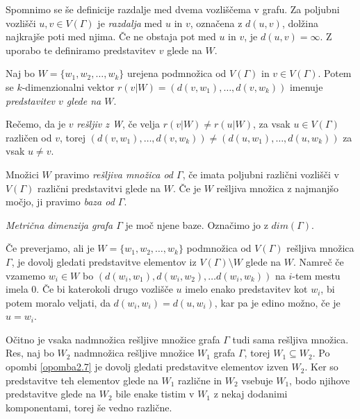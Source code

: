 \documentclass[mat1, tisk]{fmfdelo}
\begin{document}
%
Spomnimo se še definicije razdalje med dvema vozliščema v grafu. Za poljubni vozlišči 
$u,v \in V(\Gamma)$ je \emph{razdalja} med $u$ in $v$, označena z $d(u,v)$, dolžina 
najkrajše poti med njima. Če ne obstaja pot med $u$ in $v$, je $d(u,v) = \infty $.
Z uporabo te definiramo predstavitev $v$ glede na $W$.
%
\begin{definicija}
  Naj bo $W = \{ w_1,w_2, \ldots, w_k \}$ urejena podmnožica od $V(\Gamma)$ in 
  $v \in V(\Gamma)$. Potem 
  se $k$-dimenzionalni vektor $r(v|W)=( d(v,w_1), \ldots, d(v,w_k) )$ imenuje 
  \emph{predstavitev $v$ glede na $W$}. 

  Rečemo, da je $v$ \emph{rešljiv z W}, če velja $r(v|W) \neq r(u|W)$, 
  za vsak $u \in V(\Gamma)$ različen od $v$, torej 
  $( d(v,w_1), \ldots, d(v,w_k) ) \neq ( d(u,w_1), \ldots, d(u,w_k) )$ za vsak 
  $u \neq v$.
\end{definicija}
%
Množici $W$ pravimo \emph{rešljiva množica od $\Gamma$}, če imata poljubni različni 
vozlišči v $V(\Gamma)$ različni predstavitvi glede na $W$. Če je $W$ rešljiva množica 
z najmanjšo močjo, ji pravimo \emph{baza od $\Gamma$}.
%
\begin{definicija}
  \emph{Metrična dimenzija grafa $\Gamma$} je moč njene baze. Označimo jo z $dim(\Gamma)$.
\end{definicija}
%
\begin{opomba}\label{opomba2.7}
  Če preverjamo, ali je $W= \{w_1,w_2, \ldots, w_k\}$ podmnožica od $V(\Gamma)$ 
  rešljiva množica $\Gamma$, je dovolj gledati predstavitve elementov iz 
  $V(\Gamma) \setminus W$ glede na $W$. Namreč če vzamemo $w_i \in W$ bo 
  $(d(w_i,w_1),d(w_i,w_2), \ldots d(w_i,w_k))$ na $i$-tem mestu imela 0. 
  Če bi katerokoli drugo vozlišče $u$ imelo enako predstavitev kot $w_i$, bi 
  potem moralo veljati, da $d(w_i,w_i) = d(u,w_i)$, kar pa je edino možno, 
  če je $u = w_i$.
\end{opomba}
%
\begin{opomba}\label{opomba2.8}
  Očitno je vsaka nadmnožica rešljive množice grafa $\Gamma$ tudi sama rešljiva 
  množica. Res, naj bo $W_2$ nadmnožica rešljive množice $W_1$ grafa $\Gamma$, 
  torej $W_1 \subseteq W_2$. Po opombi \ref{opomba2.7} je dovolj gledati 
  predstavitve elementov izven $W_2$. Ker so predstavitve teh elementov glede na 
  $W_1$ različne in $W_2$ vsebuje $W_1$, bodo njihove predstavitve glede na 
  $W_2$ bile enake tistim v $W_1$ z nekaj dodanimi komponentami, torej še vedno 
  različne.
\end{opomba}
\end{document}

